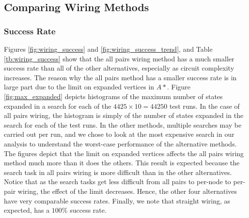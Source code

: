 \subsection{Comparing Wiring Methods}

\subsubsection{Success Rate}
Figures \ref{fig:wiring_success} and \ref{fig:wiring_success_trend}, and Table
\ref{tb:wiring_success} show that the all pairs wiring method has a much smaller
success rate than all of
the other alternatives, especially as circuit complexity increases. The reason
why the all pairs method has a smaller success rate is in
large part due to the limit on expanded vertices in $A*$.
Figure \ref{fig:max_expanded} depicts histograms of the maximum number of
states expanded in a search for each of the $4425 \times 10 = 44250$ test runs.
In the case of all pairs wiring, the histogram is simply of the number of
states expanded in the search for each of the test runs. In the other methods,
multiple searches may be carried out per run, and we chose to look at the most
expensive search in our analysis to understand the worst-case performance of
the alternative methods. The figures depict that the limit on expanded
vertices affects
the all pairs wiring method much more than it does the others. This result is
expected because the search task in all pairs wiring is more difficult than in
the other alternatives. Notice that as the search tasks get less difficult from
all pairs to per-node to per-pair wiring, the effect of the limit
decreases. Hence, the other four alternatives have very comparable success rates.
Finally, we note that straight wiring, as expected, has a $100\%$ success rate.

